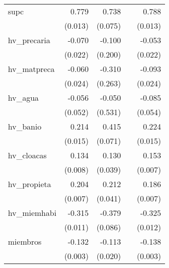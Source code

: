 {\begin{longtable}{l*{4}{D{.}{.}{-1}}}
\addlinespace
supc        &       0.779\sym{***}&       0.738\sym{***}&                     &       0.788\sym{***}\\
            &     (0.013)         &     (0.075)         &                     &     (0.013)         \\
\addlinespace
hv\_precaria &      -0.070\sym{**} &      -0.100         &                     &      -0.053\sym{*}  \\
            &     (0.022)         &     (0.200)         &                     &     (0.022)         \\
\addlinespace
hv\_matpreca &      -0.060\sym{*}  &      -0.310         &                     &      -0.093\sym{***}\\
            &     (0.024)         &     (0.263)         &                     &     (0.024)         \\
\addlinespace
hv\_agua     &      -0.056         &      -0.050         &                     &      -0.085         \\
            &     (0.052)         &     (0.531)         &                     &     (0.054)         \\
\addlinespace
hv\_banio    &       0.214\sym{***}&       0.415\sym{***}&                     &       0.224\sym{***}\\
            &     (0.015)         &     (0.071)         &                     &     (0.015)         \\
\addlinespace
hv\_cloacas  &       0.134\sym{***}&       0.130\sym{**} &                     &       0.153\sym{***}\\
            &     (0.008)         &     (0.039)         &                     &     (0.007)         \\
\addlinespace
hv\_propieta &       0.204\sym{***}&       0.212\sym{***}&                     &       0.186\sym{***}\\
            &     (0.007)         &     (0.041)         &                     &     (0.007)         \\
\addlinespace
hv\_miemhabi &      -0.315\sym{***}&      -0.379\sym{***}&                     &      -0.325\sym{***}\\
            &     (0.011)         &     (0.086)         &                     &     (0.012)         \\
\addlinespace
miembros    &      -0.132\sym{***}&      -0.113\sym{***}&                     &      -0.138\sym{***}\\
            &     (0.003)         &     (0.020)         &                     &     (0.003)         \\

\end{longtable}}

